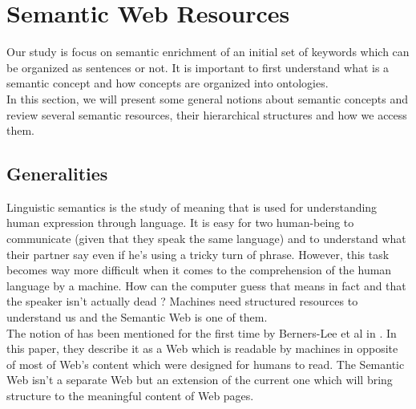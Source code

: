 
\chapter{Semantic Web Resources} %

\label{chapter:SemanticWebResources} %


Our study is focus on semantic enrichment of an initial set of keywords which can be organized as sentences or not. It is important to first understand what is a semantic concept and how concepts are organized into ontologies.\\ 

In this section, we will present some general notions about semantic concepts and review several semantic resources, their hierarchical structures and how we access them.

\section{Generalities} %
\label{sec:generalities}
Linguistic semantics is the study of meaning that is used for understanding human expression through language. It is easy for two human-being to communicate (given that they speak the same language) and to understand what their partner say even if he's using a tricky turn of phrase. However, this task becomes way more difficult when it comes to the comprehension of the human language by a machine. How can the computer guess that  means in fact  and that the speaker isn't actually dead ? Machines need structured resources to understand us and the Semantic Web is one of them.\\

The notion of  has been mentioned for the first time by Berners-Lee et al in \cite{berners2001semantic}. In this paper, they describe it as a Web which is readable by machines in opposite of most of Web's content which were designed for humans to read. The Semantic Web isn't a separate Web but an extension of the current one which will bring structure to the meaningful content of Web pages.\\

